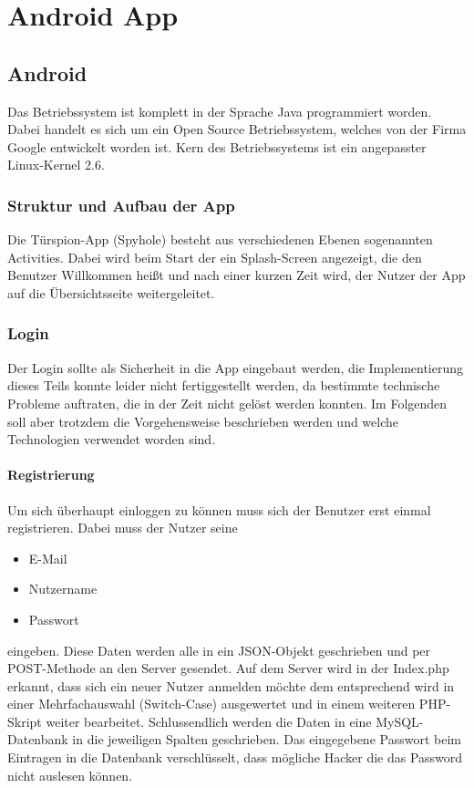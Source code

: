 
\chapter{Android App}
\section{Android}
Das Betriebssystem ist komplett in der Sprache Java programmiert worden. Dabei handelt es sich um ein Open Source Betriebssystem, welches von der Firma Google entwickelt worden ist. Kern des Betriebssystems ist ein angepasster Linux-Kernel 2.6. 
\subsection{Struktur und Aufbau der App}
Die Türspion-App (Spyhole) besteht aus verschiedenen Ebenen sogenannten Activities. Dabei wird beim Start der ein Splash-Screen angezeigt, die den Benutzer Willkommen heißt und nach einer kurzen Zeit wird, der Nutzer der App auf die Übersichtsseite weitergeleitet.
\subsection{Login}
Der Login sollte als Sicherheit in die App eingebaut werden, die Implementierung dieses Teils konnte leider nicht fertiggestellt werden, da bestimmte technische Probleme auftraten, die in der Zeit nicht gelöst werden konnten. Im Folgenden soll aber trotzdem die Vorgehensweise beschrieben werden und welche Technologien verwendet worden sind.
\subsubsection{Registrierung}
Um sich überhaupt einloggen zu können muss sich der Benutzer erst einmal registrieren. Dabei muss der Nutzer seine 
\begin{itemize}
	\item{E-Mail}
	\item{Nutzername}
	\item{Passwort}
\end{itemize}
eingeben. Diese Daten werden alle in ein JSON-Objekt geschrieben und per POST-Methode an den Server gesendet. Auf dem Server wird in der Index.php erkannt, dass sich ein neuer Nutzer anmelden möchte dem entsprechend wird in einer Mehrfachauswahl (Switch-Case) ausgewertet und in einem weiteren PHP-Skript weiter bearbeitet. Schlussendlich werden die Daten in eine MySQL-Datenbank in die jeweiligen Spalten geschrieben. Das eingegebene Passwort beim Eintragen in die Datenbank verschlüsselt, dass mögliche Hacker die das Password nicht auslesen können. 
